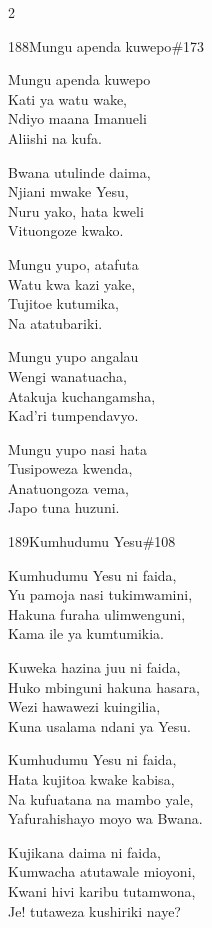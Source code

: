 \documentclass{article}
\begin{document}
\begin{multicols}{2}
\begin{hymn}{188}{Mungu apenda kuwepo}{\#173}
\begin{stanza}
Mungu apenda kuwepo\\
Kati ya watu wake,\\
Ndiyo maana Imanueli\\
Aliishi na kufa.
\end{stanza}
\begin{chorus}
Bwana utulinde daima,\\
Njiani mwake Yesu,\\
Nuru yako, hata kweli\\
Vituongoze kwako.
\end{chorus}
\begin{stanza}
Mungu yupo, atafuta\\
Watu kwa kazi yake,\\
Tujitoe kutumika,\\
Na atatubariki.
\end{stanza}
\begin{stanza}
Mungu yupo angalau\\
Wengi wanatuacha,\\
Atakuja kuchangamsha,\\
Kad'ri tumpendavyo.
\end{stanza}
\begin{stanza}
Mungu yupo nasi hata\\
Tusipoweza kwenda,\\
Anatuongoza vema,\\
Japo tuna huzuni.
\end{stanza}
\end{hymn}

\begin{hymn}{189}{Kumhudumu Yesu}{\#108}
\begin{stanza}
Kumhudumu Yesu ni faida,\\
Yu pamoja nasi tukimwamini,\\
Hakuna furaha ulimwenguni,\\
Kama ile ya kumtumikia.
\end{stanza}
\begin{stanza}
Kuweka hazina juu ni faida,\\
Huko mbinguni hakuna hasara,\\
Wezi hawawezi kuingilia,\\
Kuna usalama ndani ya Yesu.
\end{stanza}
\begin{stanza}
Kumhudumu Yesu ni faida,\\
Hata kujitoa kwake kabisa,\\
Na kufuatana na mambo yale,\\
Yafurahishayo moyo wa Bwana.
\end{stanza}
\begin{stanza}
Kujikana daima ni faida,\\
Kumwacha atutawale mioyoni,\\
Kwani hivi karibu tutamwona,\\
Je! tutaweza kushiriki naye?
\end{stanza}
\end{hymn}


\end{multicols}
\end{document}
